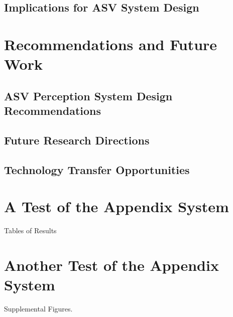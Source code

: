 \documentclass{erauthesis}
\begin{document}
\section{Implications for ASV System Design}

\chapter{Recommendations and Future Work}


\section{ASV Perception System Design Recommendations}

\section{Future Research Directions}

\section{Technology Transfer Opportunities}





% 


\backmatter

\chapter{A Test of the Appendix System}

Tables of Results

\chapter{Another Test of the Appendix System}
Supplemental Figures.
\end{document}

